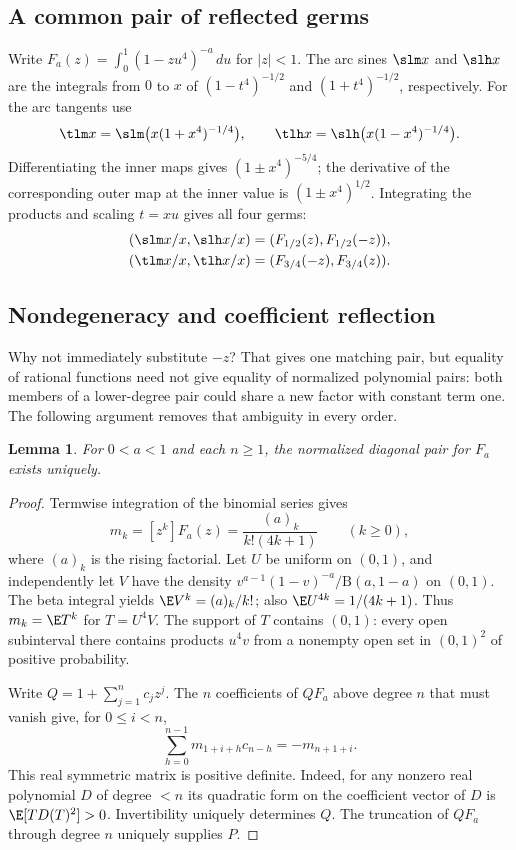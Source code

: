\documentclass[11pt,a4paper]{article}
\numberwithin{equation}{section}
\newtheorem{lemma}[theorem]{Lemma}
\theoremstyle{definition}
\theoremstyle{remark}
\begin{document}
\subsection{A common pair of reflected germs}
Write $F_a(z)=\int_0^1(1-zu^4)^{-a}\,du$ for $|z|<1$. The arc sines $\slm x$ and $\slh x$ are the integrals from $0$ to $x$ of $(1-t^4)^{-1/2}$ and $(1+t^4)^{-1/2}$, respectively. For the arc tangents use
\[
\tlm x=\slm\big(x(1+x^4)^{-1/4}\big),\qquad
\tlh x=\slh\big(x(1-x^4)^{-1/4}\big).
\]
Differentiating the inner maps gives $(1\pm x^4)^{-5/4}$; the derivative of the corresponding outer map at the inner value is $(1\pm x^4)^{1/2}$. Integrating the products and scaling $t=xu$ gives all four germs:
\begin{align*}
(\slm x/x,\slh x/x)&=(F_{1/2}(z),F_{1/2}(-z)),\\
(\tlm x/x,\tlh x/x)&=(F_{3/4}(-z),F_{3/4}(z)).
\end{align*}

\subsection{Nondegeneracy and coefficient reflection}
Why not immediately substitute $-z$? That gives one matching pair, but equality of rational functions need not give equality of normalized polynomial pairs: both members of a lower-degree pair could share a new factor with constant term one. The following argument removes that ambiguity in every order.
\begin{lemma}
For $0<a<1$ and each $n\ge1$, the normalized diagonal pair for $F_a$ exists uniquely.
\end{lemma}
\begin{proof}
Termwise integration of the binomial series gives
\[
m_k=[z^k]F_a(z)=\frac{(a)_k}{k!(4k+1)}\qquad(k\ge0),
\]
where $(a)_k$ is the rising factorial. Let $U$ be uniform on $(0,1)$, and independently let $V$ have the density $v^{a-1}(1-v)^{-a}/\mathrm B(a,1-a)$ on $(0,1)$. The beta integral yields $\E V^k=(a)_k/k!$; also $\E U^{4k}=1/(4k+1)$. Thus $m_k=\E T^k$ for $T=U^4V$. The support of $T$ contains $(0,1)$: every open subinterval there contains products $u^4v$ from a nonempty open set in $(0,1)^2$ of positive probability.

Write $Q=1+\sum_{j=1}^n c_jz^j$. The $n$ coefficients of $QF_a$ above degree $n$ that must vanish give, for $0\le i<n$,
\[
\sum_{h=0}^{n-1} m_{1+i+h} c_{n-h}=-m_{n+1+i}.
\]
This real symmetric matrix is positive definite. Indeed, for any nonzero real polynomial $D$ of degree $<n$ its quadratic form on the coefficient vector of $D$ is $\E[T D(T)^2]>0$. Invertibility uniquely determines $Q$. The truncation of $QF_a$ through degree $n$ uniquely supplies $P$.
\end{proof}
\end{document}
